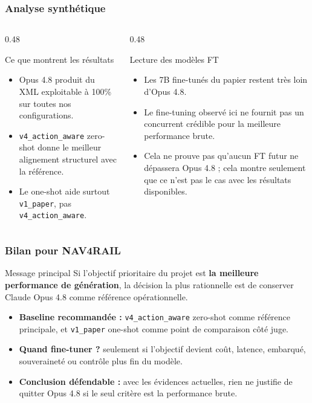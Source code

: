 \documentclass[aspectratio=169]{beamer}
\begin{document}
\begin{frame}
  \frametitle{Analyse synthétique}

  \begin{columns}[T]
    \begin{column}{0.48\textwidth}
      \begin{block}{Ce que montrent les résultats}
        \small
        \begin{itemize}
          \item Opus 4.8 produit du XML exploitable à 100\% sur toutes nos configurations.
          \item \texttt{v4\_action\_aware} zero-shot donne le meilleur alignement structurel avec la référence.
          \item Le one-shot aide surtout \texttt{v1\_paper}, pas \texttt{v4\_action\_aware}.
        \end{itemize}
      \end{block}
    \end{column}
    \begin{column}{0.48\textwidth}
      \begin{block}{Lecture des modèles FT}
        \small
        \begin{itemize}
          \item Les 7B fine-tunés du papier restent très loin d'Opus 4.8.
          \item Le fine-tuning observé ici ne fournit pas un concurrent crédible pour la meilleure performance brute.
          \item Cela ne prouve pas qu'aucun FT futur ne dépassera Opus 4.8 ; cela montre seulement que ce n'est pas le cas avec les résultats disponibles.
        \end{itemize}
      \end{block}
    \end{column}
  \end{columns}
\end{frame}

\begin{frame}
  \frametitle{Bilan pour NAV4RAIL}

  \begin{alertblock}{Message principal}
    \small
    Si l'objectif prioritaire du projet est \textbf{la meilleure performance de génération}, la décision la plus rationnelle est de conserver Claude Opus 4.8 comme référence opérationnelle.
  \end{alertblock}

  \vspace{0.4em}
  \begin{itemize}
    \item \textbf{Baseline recommandée :} \texttt{v4\_action\_aware} zero-shot comme référence principale, et \texttt{v1\_paper} one-shot comme point de comparaison côté juge.
    \item \textbf{Quand fine-tuner ?} seulement si l'objectif devient coût, latence, embarqué, souveraineté ou contrôle plus fin du modèle.
    \item \textbf{Conclusion défendable :} avec les évidences actuelles, rien ne justifie de quitter Opus 4.8 si le seul critère est la performance brute.
  \end{itemize}
\end{frame}
\end{document}
